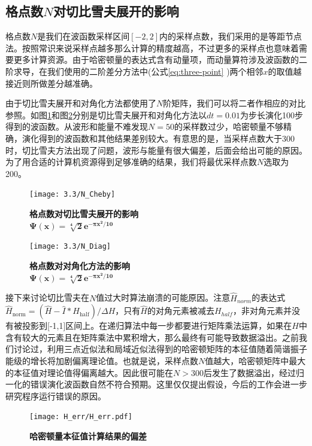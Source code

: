 \subsection{格点数$N$对切比雪夫展开的影响}
格点数$N$是我们在波函数采样区间$\left[-2,2\right]$内的采样点数，我们采用的是等距节点法。按照常识来说采样点越多那么计算的精度越高，不过更多的采样点也意味着需要更多计算资源。由于哈密顿量的表达式含有动量项，而动量算符涉及波函数的二阶求导，在我们使用的二阶差分方法中(公式\ref{eq:three-point} )两个相邻$x$的取值越接近则所做差分越准确。

由于切比雪夫展开和对角化方法都使用了$N$阶矩阵，我们可以将二者作相应的对比参照。如图\ref{fig:N_Cheby}和图\ref{fig:N_Diag}分别是切比雪夫展开和对角化方法以$dt=0.01$为步长演化100步得到的波函数。从波形和能量不难发现$N=50$的采样数过少，哈密顿量不够精确，演化得到的波函数和其他结果差别较大。有意思的是，当采样点数大于300时，切比雪夫方法出现了问题，波形与能量有很大偏差，后面会给出可能的原因。为了用合适的计算机资源得到足够准确的结果，我们将最优采样点数$N$选取为200。

\begin{figure}[h]
  \centering
  \captionsetup{justification=centering}
  \vspace{1mm}
  \texttt{[image: 3.3/N\_Cheby]}
  \caption{\textbf{格点数对切比雪夫展开的影响}\\
                    $\boldsymbol{\Psi(x) = \sqrt[4]{2}e^{-\pi x^2 /10}}$ \label{fig:N_Cheby}}
\end{figure}
\begin{figure}[h]
  \centering
  \captionsetup{justification=centering}
  \vspace{1mm}
  \texttt{[image: 3.3/N\_Diag]}
  \caption{\textbf{格点数对对角化方法的影响}\\
                      $\boldsymbol{\Psi(x) = \sqrt[4]{2}e^{-\pi x^2 /10}}$ \label{fig:N_Diag}}
\end{figure}

接下来讨论切比雪夫在$N$值过大时算法崩溃的可能原因。注意$\hat{H}_{norm}$的表达式$\hat{H}_{\text{norm}}  =  (\hat{H} - \hat{I}*H_{\text{half}}) / \Delta H$，只有$\hat{H}$的对角元素被减去$H_{half}$，非对角元素并没有被投影到[-1,1]区间上。在递归算法中每一步都要进行矩阵乘法运算，如果在$H$中含有较大的元素且在矩阵乘法中累积增大，那么最终有可能导致数据溢出。之前我们讨论过，利用三点近似法和局域近似法得到的哈密顿矩阵的本征值随着简谐振子能级的增长将加剧偏离理论值。也就是说，采样点数$N$值越大，哈密顿矩阵中最大的本征值对理论值得偏离越大。因此很可能在$N>300$后发生了数据溢出，经过归一化的错误演化波函数自然不符合预期。这里仅仅提出假设，今后的工作会进一步研究程序运行错误的原因。
\begin{figure}[hbt]
  \centering
  \captionsetup{justification=centering}
  \vspace{1mm}
  \texttt{[image: H\_err/H\_err.pdf]}
  \caption{\textbf{哈密顿量本征值计算结果的偏差} \label{fig:N_Hamiltonian}}
\end{figure}


